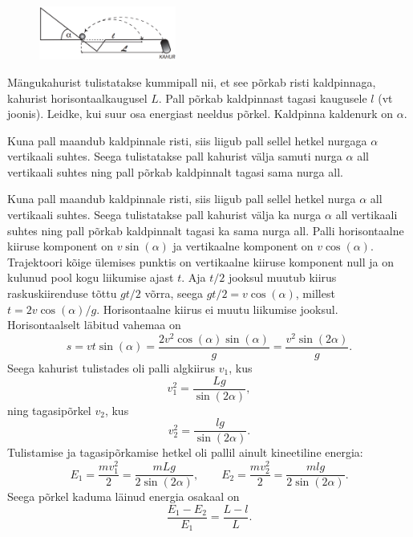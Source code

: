 
\begin{figure}
 \vspace{-20pt}
 \begin{center}
 \includegraphics[width=0.4\textwidth]{2016-lahg-01-kaldjoonis}
 \end{center}
 \vspace{-30pt}
\end{figure}

Mängukahurist tulistatakse kummipall nii, et see põrkab risti kaldpinnaga, kahurist horisontaalkaugusel $L$. Pall põrkab kaldpinnast tagasi kaugusele $l$ (vt joonis). Leidke, kui suur osa energiast neeldus põrkel. Kaldpinna kaldenurk on $\alpha$.

\hint
Kuna pall maandub kaldpinnale risti, siis liigub pall sellel hetkel nurgaga $\alpha$ vertikaali suhtes. Seega tulistatakse pall kahurist välja samuti nurga $\alpha$ all vertikaali suhtes ning pall põrkab kaldpinnalt tagasi sama nurga all.

\solu
Kuna pall maandub kaldpinnale risti, siis liigub pall sellel hetkel nurga $\alpha$ all vertikaali suhtes. Seega tulistatakse pall kahurist välja ka nurga $\alpha$ all vertikaali suhtes ning pall põrkab kaldpinnalt tagasi ka sama nurga all. Palli horisontaalne kiiruse komponent on $v\sin(\alpha)$ ja vertikaalne komponent on $v\cos(\alpha)$. Trajektoori kõige ülemises punktis on vertikaalne kiiruse komponent null ja on kulunud pool kogu liikumise ajast $t$. Aja $t/2$ jooksul muutub kiirus raskuskiirenduse tõttu $gt/2$ võrra, seega $gt/2 =v\cos(\alpha)$, millest $t=2v\cos(\alpha)/g$. Horisontaalne kiirus ei muutu liikumise jooksul. Horisontaalselt läbitud vahemaa on $$s=vt\sin(\alpha)=\frac{2v^2\cos(\alpha)\sin(\alpha)}{g} = \frac{v^2\sin(2\alpha)}{g}.$$
Seega kahurist tulistades oli palli algkiirus $v_1$, kus
\[ v_1^2 = \frac{Lg}{\sin(2\alpha)}, \]
ning tagasipõrkel $v_2$, kus
\[ v_2^2 = \frac{lg}{\sin(2\alpha)}. \]
Tulistamise ja tagasipõrkamise hetkel oli pallil ainult kineetiline energia:
\[ E_1 = \frac{mv_1^2}{2}=\frac{mLg}{2\sin(2\alpha)},\quad\quad E_2 =\frac{mv_2^2}{2} = \frac{mlg}{2\sin(2\alpha)}. \]
Seega põrkel kaduma läinud energia osakaal on
\[ \frac{E_1-E_2}{E_1} = \frac{L-l}{L}. \]


